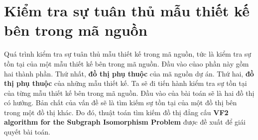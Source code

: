 \documentclass[12pt]{report}
\begin{document}
\section{Kiểm tra sự tuân thủ mẫu thiết kế bên trong mã nguồn}
Quá trình kiểm tra sự tuân thủ mẫu thiết kế trong mã nguồn, tức là kiểm tra sự tồn tại của một mẫu thiết kế bên trong mã nguồn. Đầu vào củao phần này gồm hai thành phần. Thứ nhất, \textbf{đồ thị phụ thuộc} của mã nguồn dự án. Thứ hai, \textbf{đồ thị phụ thuộc} của những mẫu thiết kế. Ta sẽ đi tiến hành kiểm tra sự tồn tại của từng mẫu thiết kế bên trong mã nguồn. 
Đầu vào của bài toán sẽ là hai đồ thị có hướng. Bản chất của vấn đề sẽ là tìm kiếm sự tồn tại của một đồ thị bên trong một đồ thị khác. Đo đó, thuật toán tìm kiếm đồ thị đẳng cấu \textbf{VF2 algorithm for the Subgraph Isomorphism Problem} được đề xuất để giái quyết bài toán.
\end{document}
